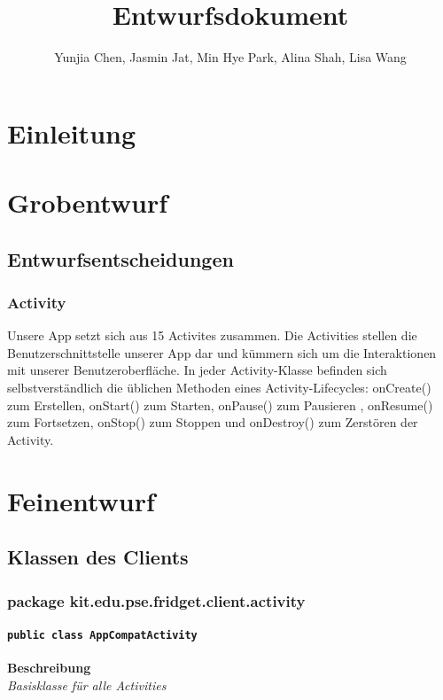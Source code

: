 \documentclass[a4paper]{scrreprt}
\title{Entwurfsdokument}
\author{   Yunjia Chen, Jasmin Jat, Min Hye Park, Alina Shah, Lisa Wang}
\begin{document}
\maketitle
\tableofcontents 
\newpage
\chapter{Einleitung}

\chapter{Grobentwurf}
	\section{Entwurfsentscheidungen}
    	\subsection{Activity}
        Unsere App setzt sich aus 15 Activites zusammen. Die Activities stellen die Benutzerschnittstelle unserer App dar und kümmern sich um die Interaktionen mit unserer Benutzeroberfläche. In jeder Activity-Klasse befinden sich selbstverständlich die üblichen Methoden eines Activity-Lifecycles: onCreate() zum Erstellen, onStart() zum Starten, onPause() zum Pausieren , onResume() zum Fortsetzen, onStop() zum Stoppen und onDestroy() zum Zerstören der Activity.
        
        
\newpage

\chapter{Feinentwurf}
	\section{Klassen des Clients}
    	\subsection{package kit.edu.pse.fridget.client.activity}
    	\subsubsection{\texttt{public class AppCompatActivity}}
               
               	\textbf{Beschreibung} \\
      	        \textit{Basisklasse für alle Activities} \\
                
\end{document}
